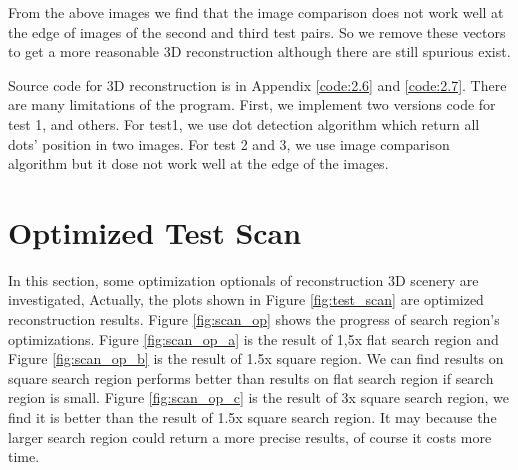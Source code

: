 From the above images we find that the image comparison does not work well at the edge of images of the second and third test pairs. So we remove these vectors to get a more reasonable 3D reconstruction although there are still spurious exist. 

Source code for 3D reconstruction is in Appendix \ref{code:2.6} and \ref{code:2.7}. There are many limitations of the program. First, we implement two versions code for test 1, and others. For test1, we use dot detection algorithm which return all dots' position in two images. For test 2 and 3, we use image comparison algorithm but it dose not work well at the edge of the images. 


\section{Optimized Test Scan}

In this section, some optimization optionals of reconstruction 3D scenery are investigated, Actually, the plots shown in Figure \ref{fig:test_scan} are optimized reconstruction results. Figure \ref{fig:scan_op} shows the progress of search region's optimizations. Figure \ref{fig:scan_op_a} is the result of 1,5x flat search region and Figure \ref{fig:scan_op_b} is the result of 1.5x square region. We can find results on square search region performs better than results on flat search region if search region is small. Figure \ref{fig:scan_op_c} is the result of 3x square search region, we find it is better than the result of 1.5x square search region. It may because the larger search region could return a more precise results, of course it costs more time. 

